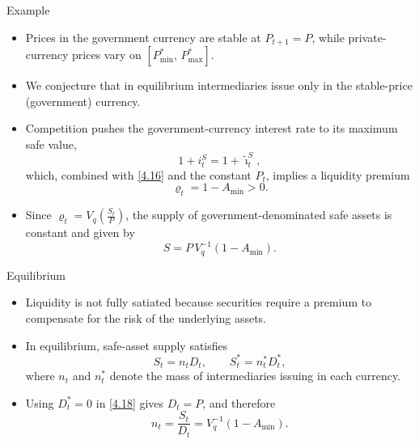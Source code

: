 \documentclass[11pt,aspectratio=169]{beamer}
\begin{document}
\begin{frame}{Example}
\small
\begin{itemize}

\item Prices in the government currency are stable at $P_{t+1}=P$, while private-currency prices vary on $[P_{\min}^\ast,\, P_{\max}^\ast]$.

\item We conjecture that in equilibrium intermediaries issue only in the stable-price (government) currency.

\item Competition pushes the government-currency interest rate to its maximum safe value,
\[
1+i_t^S = 1+\tilde{\imath}_t^S,
\]
which, combined with \eqref{4.16} and the constant $P_t$, implies a liquidity premium  
\[
\varrho_t = 1 - A_{\min} > 0.
\]

\item Since $\varrho_t = V_q\!\left(\tfrac{S_t}{P}\right)$, the supply of government-denominated safe assets is constant and given by
\[
S = P\, V_q^{-1}(1 - A_{\min}).
\]

\end{itemize}
\end{frame}

\begin{frame}{Equilibrium}
\small
\begin{itemize}

\item Liquidity is not fully satiated because securities require a premium to compensate for the risk of the underlying assets.

\item In equilibrium, safe-asset supply satisfies  
\[
S_t = n_t D_t, \qquad S_t^\ast = n_t^\ast D_t^\ast,
\]
where $n_t$ and $n_t^\ast$ denote the mass of intermediaries issuing in each currency.

\item Using $D_t^\ast = 0$ in \eqref{4.18} gives $D_t = P$, and therefore
\[
n_t = \frac{S_t}{D_t} = V_q^{-1}(1 - A_{\min}).
\]

\end{itemize}
\end{frame}
\end{document}
